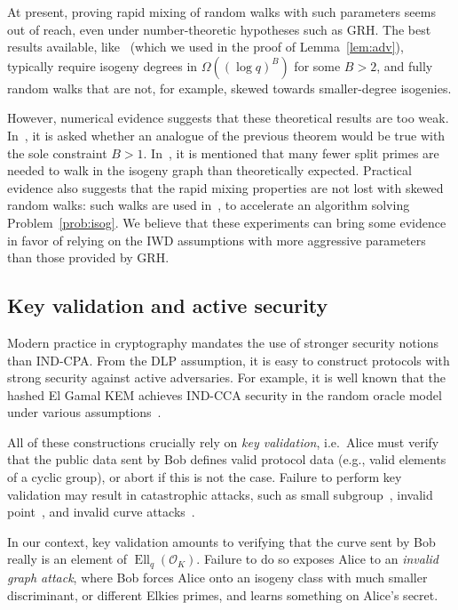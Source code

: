 \documentclass{llncs}
\renewcommand{\O}{\mathcal{O}}
\DeclareMathOperator{\Ell}{Ell}
\begin{document}
At present, proving rapid mixing of random walks with such
parameters seems out of reach, even under number-theoretic
hypotheses such as GRH. The best results available,
like~\cite[Theorem~1.5]{jao+miller+venkatesan09}
(which we used in the proof of Lemma~\ref{lem:adv}),
typically require isogeny degrees in $\Omega((\log q)^B)$
for some $B>2$, and fully random walks that are not,
for example, skewed towards smaller-degree isogenies.

However, numerical evidence suggests that
these theoretical results are too weak. In~\cite[7.2]{jao+miller+venkatesan09},
it is asked whether an analogue of the previous theorem would
be true with the sole constraint $B>1$. In~\cite[Section~3]{GHS},
it is mentioned that many fewer split primes are needed to walk
in the isogeny graph than theoretically expected.
Practical evidence also suggests that the rapid mixing
properties are not lost with skewed random walks:
such walks are used in~\cite{galbraith+stolbunov11},
to accelerate an algorithm solving Problem~\ref{prob:isog}.
We believe that these experiments can bring some evidence
in favor of relying on the IWD assumptions with more aggressive
parameters than those provided by GRH.


\subsection{Key validation and active security}

Modern practice in cryptography mandates the use of stronger security
notions than IND-CPA.  From the DLP assumption, it is easy to
construct protocols with strong security against active adversaries.
For example, it is well known that the hashed El Gamal KEM achieves
IND-CCA security in the random oracle model under various
assumptions~\cite[§7]{10.1007/3-540-45353-9_12,cryptoeprint:1999:007,doi:10.1137/S0097539702403773}.

All of these constructions crucially rely on \emph{key validation}, 
i.e.\ Alice must verify that the public data sent by Bob defines valid
protocol data (e.g., valid elements of a cyclic group), or abort if
this is not the case.
Failure to perform key validation may result in catastrophic attacks,
such as small subgroup~\cite{10.1007/BFb0052240}, invalid
point~\cite{10.1007/3-540-44598-6_8}, and invalid curve
attacks~\cite{Ciet2005}.  

In our context, key validation amounts to
verifying that the curve sent by Bob really is an element of
$\Ell_q(\O_K)$. Failure to do so exposes Alice to an \emph{invalid
  graph attack}, where Bob forces Alice onto an isogeny class with much
smaller discriminant, or different Elkies primes, and learns something
on Alice's secret.
\end{document}
